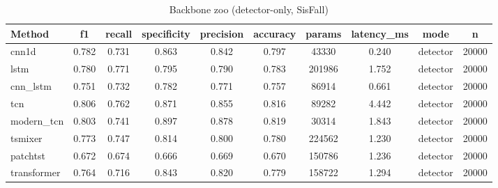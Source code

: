 \begin{table}[t]
\centering
\caption{Backbone zoo (detector-only, SisFall)}
\begin{tabular}{lccccccccc}
\toprule
Method & f1 & recall & specificity & precision & accuracy & params & latency_ms & mode & n \\
\midrule
cnn1d & 0.782 & 0.731 & 0.863 & 0.842 & 0.797 & 43330 & 0.240 & detector & 20000 \\
lstm & 0.780 & 0.771 & 0.795 & 0.790 & 0.783 & 201986 & 1.752 & detector & 20000 \\
cnn_lstm & 0.751 & 0.732 & 0.782 & 0.771 & 0.757 & 86914 & 0.661 & detector & 20000 \\
tcn & 0.806 & 0.762 & 0.871 & 0.855 & 0.816 & 89282 & 4.442 & detector & 20000 \\
modern_tcn & 0.803 & 0.741 & 0.897 & 0.878 & 0.819 & 30314 & 1.843 & detector & 20000 \\
tsmixer & 0.773 & 0.747 & 0.814 & 0.800 & 0.780 & 224562 & 1.230 & detector & 20000 \\
patchtst & 0.672 & 0.674 & 0.666 & 0.669 & 0.670 & 150786 & 1.236 & detector & 20000 \\
transformer & 0.764 & 0.716 & 0.843 & 0.820 & 0.779 & 158722 & 1.294 & detector & 20000 \\
\bottomrule
\end{tabular}
\end{table}